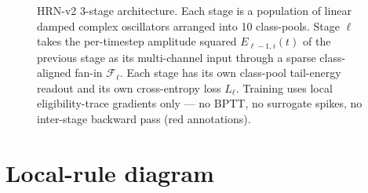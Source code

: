 \documentclass[11pt]{article}
\begin{document}
\begin{figure}[p]
{%
}
\caption{HRN-v2 3-stage architecture.  Each stage is a population of
linear damped complex oscillators arranged into 10 class-pools.  Stage
$\ell$ takes the per-timestep amplitude squared $E_{\ell-1, i}(t)$ of
the previous stage as its multi-channel input through a sparse class-aligned
fan-in $\mathcal F_\ell$.  Each stage has its own class-pool tail-energy
readout and its own cross-entropy loss $L_\ell$.  Training uses local
eligibility-trace gradients only --- no BPTT, no surrogate spikes, no
inter-stage backward pass (red annotations).}
\label{fig:arch}
\end{figure}

\section{Local-rule diagram}
\end{document}
